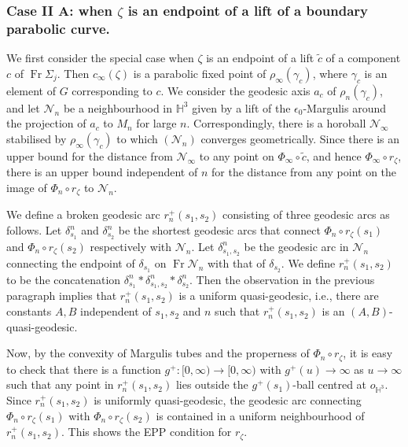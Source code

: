 \documentclass{amsart}
\theoremstyle{definition}
\newcommand{\Fr}{\operatorname{Fr}}
\newcommand\HHH{{\mathbb H}}
\begin{document}
\subsubsection{Case II A: when $\zeta$ is an endpoint of a lift of a boundary parabolic curve.}
We first consider the special case when $\zeta$ is an endpoint of a lift $\tilde c$ of a component $c$ of $\Fr \Sigma_j$.
Then $c_\infty(\zeta)$ is a parabolic fixed point of $\rho_\infty(\gamma_c)$, where $\gamma_c$ is an element of $G$ corresponding to $c$.
We consider the  geodesic axis $a_c$ of $\rho_n(\gamma_c)$, and let  $\mathcal N_n$ be a neighbourhood in $\HHH^3$ given by a lift of the $\epsilon_0$-Margulis around the projection of $a_c$ to $M_n$ for large $n$.
Correspondingly, there is a horoball $\mathcal N_\infty$ stabilised by $\rho_\infty(\gamma_c)$ to which $(\mathcal N_n)$ converges geometrically.
Since there is an upper bound for the distance from $\mathcal N_\infty$  to 
any point on $\Phi_\infty \circ \tilde c$, and hence $\Phi_\infty \circ r_\zeta$, there is an upper bound independent of $n$ for the distance from any point on the image of  $\Phi_n \circ r_\zeta$ to $\mathcal N_n$.

We define a broken geodesic arc $r_n^+(s_1,s_2)$  consisting of three geodesic arcs as follows. Let $\delta_{s_1}^n$ and $\delta_{s_2}^n$ be the shortest geodesic arcs that connect  $\Phi_n \circ r_\zeta(s_1)$ and $\Phi_n \circ r_\zeta(s_2)$ respectively with $\mathcal N_n$.  Let $\delta_{s_1,s_2}^n$ be the geodesic arc in $\mathcal N_n$ connecting the endpoint of $\delta_{s_1}$ on $\Fr \mathcal N_n$ with that of $\delta_{s_2}$.
We define $r_n^+(s_1,s_2)$ to be the concatenation $\delta^n_{s_1} * \delta^n_{s_1,s_2} * \delta^n_{s_2}$.
Then the observation in the previous paragraph implies that $r_n^+(s_1,s_2)$ is a uniform quasi-geodesic, i.e., there are constants $A,B$ independent of $s_1,s_2$ and $n$ such that $r_n^+(s_1,s_2)$ is an $(A,B)$-quasi-geodesic.

Now, by the convexity of Margulis tubes and the properness of $\Phi_n \circ r_\zeta$, it is easy to check that there is a function $g^+\colon [0,\infty) \to [0,\infty)$ with $g^+(u) \to \infty$ as $u \to \infty$ such that any point in $r_n^+(s_1,s_2)$ lies outside the $g^+(s_1)$-ball centred at $o_{\HHH^3}$.
Since $r_n^+(s_1,s_2)$ is uniformly quasi-geodesic, the geodesic arc connecting $\Phi_n \circ r_\zeta(s_1)$ with $\Phi_n \circ r_\zeta(s_2)$ is contained in a uniform neighbourhood of $r_n^+(s_1,s_2)$.
This shows the EPP condition for $r_\zeta$.
\end{document}
